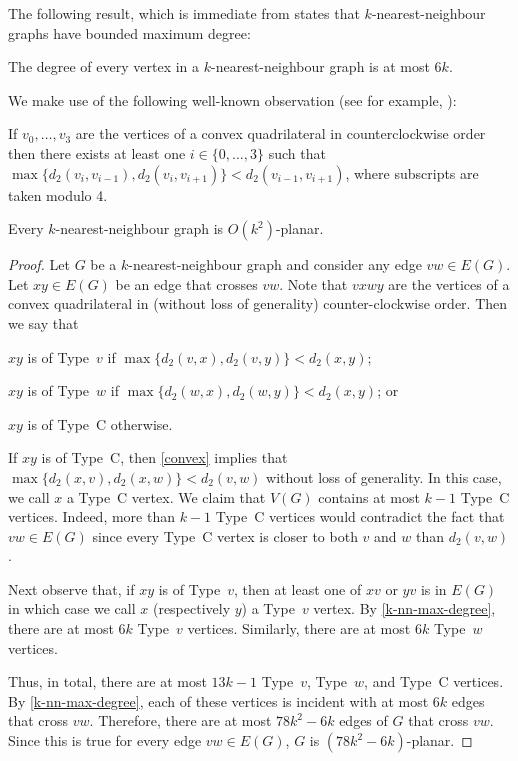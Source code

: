 \documentclass{patmorin}
\begin{document}
The following result, which is immediate from \citet[Corollary~4.2.6]{abrego.munroy.ea:on} states that $k$-nearest-neighbour graphs have bounded maximum degree:
\begin{lem}
\label{k-nn-max-degree}
The degree of every vertex in a $k$-nearest-neighbour graph is at most $6k$.
\end{lem}

We make use of the following well-known observation (see for example, \citet[Lemma~2]{bose.morin.ea:routing}):
\begin{obs}
\label{convex}
If $v_0,\ldots,v_3$ are the vertices of a convex quadrilateral in counterclockwise order then there exists at least one $i\in\{0,\ldots,3\}$ such that $\max\{d_2(v_i,v_{i-1}), d_2(v_i,v_{i+1})\} < d_2(v_{i-1},v_{i+1})$, where subscripts are taken modulo 4.
\end{obs}

\begin{lem}
\label{nearest-neighbour}
  Every $k$-nearest-neighbour graph is $O(k^2)$-planar.
\end{lem}

\begin{proof}
  Let $G$ be a $k$-nearest-neighbour graph and consider any edge $vw\in E(G)$.
  Let $xy\in E(G)$ be an edge that crosses $vw$.  Note that $vxwy$ are the vertices of a convex quadrilateral in (without loss of generality) counter-clockwise order. Then we say that
  \begin{compactenum}
    \item $xy$ is of Type~$v$ if $\max\{d_2(v,x), d_2(v,y)\}< d_2(x,y)$;
    \item $xy$ is of Type~$w$ if $\max\{d_2(w,x), d_2(w,y)\}< d_2(x,y)$; or
    \item $xy$ is of Type~C otherwise.
  \end{compactenum}
  If $xy$ is of Type~C, then \cref{convex} implies that $\max\{d_2(x,v),d_2(x,w)\} < d_2(v,w)$ without loss of generality.
   In this case, we call $x$ a Type~C vertex.  We claim that $V(G)$ contains at most $k-1$ Type~C vertices.  Indeed, more than $k-1$ Type~C vertices would contradict the fact that $vw\in E(G)$ since every Type~C vertex is closer to both $v$ and $w$ than $d_2(v,w)$.

  Next observe that, if $xy$ is of Type~$v$, then at least one of $xv$ or $yv$ is in $E(G)$ in which case we call $x$ (respectively $y$) a Type~$v$ vertex.  By \cref{k-nn-max-degree}, there are at most $6k$ Type~$v$ vertices.  Similarly, there are at most $6k$ Type~$w$ vertices.

  Thus, in total, there are at most $13k-1$ Type~$v$, Type~$w$, and Type~C vertices. By \cref{k-nn-max-degree}, each of these vertices is incident with at most $6k$ edges that cross $vw$. Therefore, there are at most $78k^2-6k$ edges of $G$ that cross $vw$.  Since this is true for every edge $vw\in E(G)$, $G$ is $(78k^2-6k)$-planar.
\end{proof}
\end{document}
